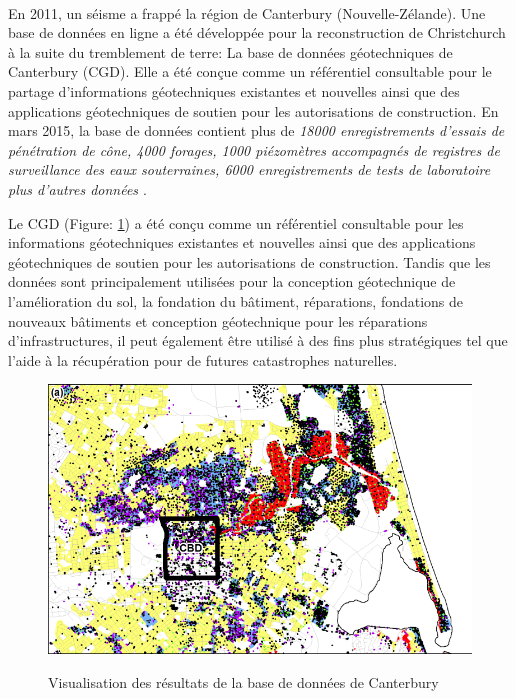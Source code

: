 
\paragraph{}
En 2011, un séisme a frappé la région de Canterbury (Nouvelle-Zélande). Une base de données en ligne a été développée pour
la reconstruction de Christchurch à la suite du tremblement de terre:
La base de données géotechniques de Canterbury (CGD). Elle
a été conçue comme un référentiel consultable pour le partage d'informations géotechniques existantes et nouvelles
ainsi que des applications géotechniques de soutien pour les autorisations de construction. En mars
2015, la base de données contient plus de \textit{18000 enregistrements d'essais de pénétration de cône, 4000 forages, 1000
piézomètres accompagnés de registres de surveillance des eaux souterraines, 6000 enregistrements de tests de laboratoire
plus d'autres données \cite{scott2015benefits}}. 

\par
Le CGD (Figure: \ref{fig:canterbury}) 
a été conçu comme un référentiel consultable pour les informations géotechniques existantes et nouvelles
ainsi que des applications géotechniques de soutien pour les autorisations de construction. Tandis que
les données sont principalement utilisées pour la conception géotechnique de l'amélioration du sol, la fondation du bâtiment,
réparations, fondations de nouveaux bâtiments et conception géotechnique pour les réparations d'infrastructures, il peut
également être utilisé à des fins plus stratégiques tel que l'aide à la récupération pour de futures
catastrophes naturelles.
\cite{scott2015benefits}

\begin{figure}[t]
    \centering
    \includegraphics[width=1\textwidth]{images/Contexte/cgd.png}
    \caption{Visualisation des résultats de la base de données de Canterbury }\cite{scott2015benefits}
    \label{fig:canterbury}
\end{figure}

